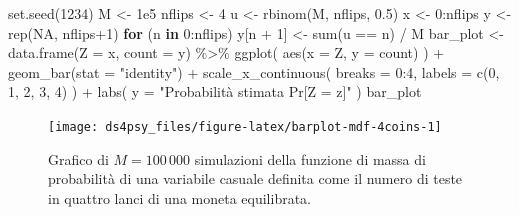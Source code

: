\documentclass[
  11pt,
]{krantz}
\makeatletter
\newenvironment{Shaded}{\begin{snugshade}}{\end{snugshade}}
\newcommand{\AttributeTok}[1]{\textcolor[rgb]{0.61,0.61,0.61}{#1}}
\newcommand{\ConstantTok}[1]{\textcolor[rgb]{0,0,0}{#1}}
\newcommand{\ControlFlowTok}[1]{\textcolor[rgb]{0.27,0.27,0.27}{\textbf{#1}}}
\newcommand{\DecValTok}[1]{\textcolor[rgb]{0.06,0.06,0.06}{#1}}
\newcommand{\FloatTok}[1]{\textcolor[rgb]{0.06,0.06,0.06}{#1}}
\newcommand{\FunctionTok}[1]{\textcolor[rgb]{0,0,0}{#1}}
\newcommand{\NormalTok}[1]{#1}
\newcommand{\OtherTok}[1]{\textcolor[rgb]{0.37,0.37,0.37}{#1}}
\newcommand{\SpecialCharTok}[1]{\textcolor[rgb]{0,0,0}{#1}}
\newcommand{\StringTok}[1]{\textcolor[rgb]{0.5,0.5,0.5}{#1}}
\newenvironment{kframe}{%
\medskip{}
\setlength{\fboxsep}{.8em}
 \def\at@end@of@kframe{}%
 \ifinner\ifhmode%
  \def\at@end@of@kframe{\end{minipage}}%
  \begin{minipage}{\columnwidth}%
 \fi\fi%
 \def\FrameCommand##1{\hskip\@totalleftmargin \hskip-\fboxsep
 \colorbox{shadecolor}{##1}\hskip-\fboxsep
     \hskip-\linewidth \hskip-\@totalleftmargin \hskip\columnwidth}%
 \MakeFramed {\advance\hsize-\width
   \@totalleftmargin\z@ \linewidth\hsize
   \@setminipage}}%
 {\par\unskip\endMakeFramed%
 \at@end@of@kframe}
\renewenvironment{Shaded}{\begin{kframe}}{\end{kframe}}
\theoremstyle{definition}
\theoremstyle{definition}
\theoremstyle{definition}
\theoremstyle{definition}
\theoremstyle{remark}
\makeatother
\begin{document}
\begin{Shaded}
\begin{Highlighting}[]
\FunctionTok{set.seed}\NormalTok{(}\DecValTok{1234}\NormalTok{)}
\NormalTok{M }\OtherTok{\textless{}{-}} \FloatTok{1e5}
\NormalTok{nflips }\OtherTok{\textless{}{-}} \DecValTok{4}
\NormalTok{u }\OtherTok{\textless{}{-}} \FunctionTok{rbinom}\NormalTok{(M, nflips, }\FloatTok{0.5}\NormalTok{)}
\NormalTok{x }\OtherTok{\textless{}{-}} \DecValTok{0}\SpecialCharTok{:}\NormalTok{nflips}
\NormalTok{y }\OtherTok{\textless{}{-}} \FunctionTok{rep}\NormalTok{(}\ConstantTok{NA}\NormalTok{, nflips}\SpecialCharTok{+}\DecValTok{1}\NormalTok{)}
\ControlFlowTok{for}\NormalTok{ (n }\ControlFlowTok{in} \DecValTok{0}\SpecialCharTok{:}\NormalTok{nflips)}
\NormalTok{  y[n }\SpecialCharTok{+} \DecValTok{1}\NormalTok{] }\OtherTok{\textless{}{-}} \FunctionTok{sum}\NormalTok{(u }\SpecialCharTok{==}\NormalTok{ n) }\SpecialCharTok{/}\NormalTok{ M}
\NormalTok{bar\_plot }\OtherTok{\textless{}{-}}
  \FunctionTok{data.frame}\NormalTok{(}\AttributeTok{Z =}\NormalTok{ x, }\AttributeTok{count =}\NormalTok{ y) }\SpecialCharTok{\%\textgreater{}\%} 
  \FunctionTok{ggplot}\NormalTok{(}
    \FunctionTok{aes}\NormalTok{(}\AttributeTok{x =}\NormalTok{ Z, }\AttributeTok{y =}\NormalTok{ count)}
\NormalTok{  ) }\SpecialCharTok{+}
  \FunctionTok{geom\_bar}\NormalTok{(}\AttributeTok{stat =} \StringTok{"identity"}\NormalTok{) }\SpecialCharTok{+}
  \FunctionTok{scale\_x\_continuous}\NormalTok{(}
    \AttributeTok{breaks =} \DecValTok{0}\SpecialCharTok{:}\DecValTok{4}\NormalTok{,}
    \AttributeTok{labels =} \FunctionTok{c}\NormalTok{(}\DecValTok{0}\NormalTok{, }\DecValTok{1}\NormalTok{, }\DecValTok{2}\NormalTok{, }\DecValTok{3}\NormalTok{, }\DecValTok{4}\NormalTok{)}
\NormalTok{  ) }\SpecialCharTok{+}
  \FunctionTok{labs}\NormalTok{(}
    \AttributeTok{y =} \StringTok{"Probabilità stimata Pr[Z = z]"}
\NormalTok{)}
\NormalTok{bar\_plot}
\end{Highlighting}
\end{Shaded}

\begin{figure}[h]

{\centering \texttt{[image: ds4psy\_files/figure-latex/barplot-mdf-4coins-1]} 

}

\caption{Grafico di $M = 100\,000$ simulazioni della funzione di massa di probabilità di una variabile casuale definita come il numero di teste in quattro lanci di una moneta equilibrata.}\label{fig:barplot-mdf-4coins}
\end{figure}
\end{document}
